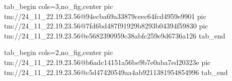  
 
 
 
 

\qqSecCmtScr


\ifcmt
  tab_begin cols=3,no_fig,center
    pic tm://24_11_22.19.23.56@94ecba69a33879ceec64fcd4959e9901
    pic tm://24_11_22.19.23.56@7fd6bd487f91929b8293b04394f59830
    pic tm://24_11_22.19.23.56@e5682390959c38abfc259e9d6736a126
  tab_end
\fi


\ifcmt
  tab_begin cols=2,no_fig,center
    pic tm://24_11_22.19.23.56@b6adc14151a56be9b7e0aba7ed20323e
    pic tm://24_11_22.19.23.56@c5d47420549aa4ab9211381954854996
  tab_end
\fi

